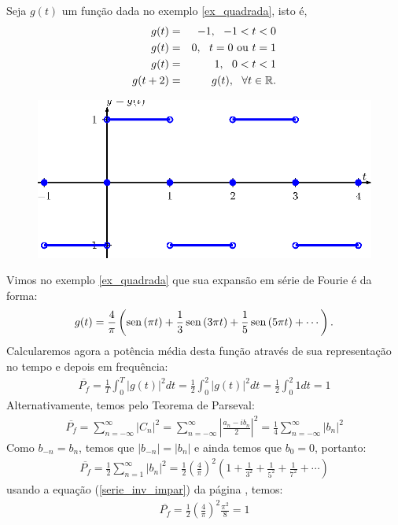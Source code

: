 \begin{ex}\label{ex_quadrada_parseval} Seja $g(t)$ um função dada no exemplo \ref{ex_quadrada}, isto é,
\begin{eqnarray*}
g(t)&=&-1, \ \ -1< t<0\\
g(t)&=&0, \ \ t=0\ \hbox{ou}\ t=1\\
g(t)&=&1, \ \ 0< t<1\\
g(t+2)&=&g(t),\ \ \forall t\in\mathbb{R}.
\end{eqnarray*}
\begin{figure}[!ht]
\begin{center}
\includegraphics{cap_propriedades_series/pics/figura_1}\end{center}
\end{figure}
Vimos no exemplo \ref{ex_quadrada} que sua expansão em série de Fourie é da forma:
\begin{equation}
g(t)=\frac{4}{\pi}\left(\operatorname{sen}\,(\pi t)+\frac{1}{3}\operatorname{sen}\,(3\pi t)+\frac{1}{5}\operatorname{sen}\,(5\pi t)+\cdots\right).
\end{equation}
Calcularemos agora a potência média desta função através de sua representação no tempo e depois em frequência:
\begin{eqnarray*}
 \overline{P_f}=\frac{1}{T}\int_0^T |g(t)|^2dt=\frac{1}{2}\int_0^2 |g(t)|^2dt=\frac{1}{2}\int_0^2 1dt=1
\end{eqnarray*}
Alternativamente, temos pelo Teorema de Parseval:
\begin{eqnarray*}
 \overline{P_f}=\sum_{n=-\infty}^\infty |C_n|^2=\sum_{n=-\infty}^\infty \left|\frac{a_n-ib_n}{2}\right|^2=\frac{1}{4}\sum_{n=-\infty}^\infty |b_n|^2
\end{eqnarray*}
Como $b_{-n}=b_n$, temos que $|b_{-n}|=|b_n|$ e ainda temos que $b_0=0$, portanto: 
\begin{eqnarray*}
 \overline{P_f}=\frac{1}{2}\sum_{n=1}^\infty |b_n|^2 = \frac{1}{2}\left(\frac{4}{\pi}\right)^2\left(1 + \frac{1}{3^2}+ \frac{1}{5^2}+ \frac{1}{7^2}+\cdots\right)
\end{eqnarray*}
usando a equação (\ref{serie_inv_impar}) da página \pageref{serie_inv_impar}, temos:
\begin{eqnarray*}
 \overline{P_f}=\frac{1}{2}\left(\frac{4}{\pi}\right)^2\frac{\pi^2}{8}=1
\end{eqnarray*}
\end{ex}


